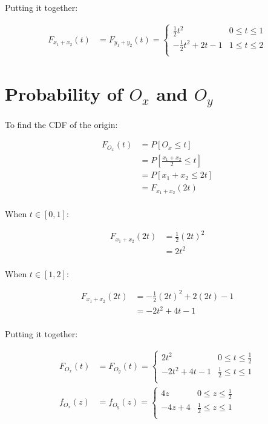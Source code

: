 \documentclass{article}
\begin{document}
Putting it together:

\begin{align*}
F_{x_1 + x_2}(t) &= F_{y_1 + y_2}(t) =
\begin{cases}
    \frac{1}{2}t^2           & 0 \leq t \leq 1 \\
    -\frac{1}{2}t^2 + 2t - 1 & 1 \leq t \leq 2 \\
\end{cases}
\end{align*}

\section{Probability of $O_x$ and $O_y$}

To find the CDF of the origin:

\begin{align*}
F_{O_x}(t)
&= P \left[ O_x \leq t \right] \\
&= P \left[ \frac{x_1 + x_2}{2} \leq t \right] \\
&= P \left[ x_1 + x_2 \leq 2t \right] \\
&= F_{x_1 + x_2}(2t) \\
\end{align*}

When $t \in [0, 1]$:

\begin{align*}
F_{x_1 + x_2}(2t)
&= \frac{1}{2}(2t)^2 \\
&= 2t^2 \\
\end{align*}

When $t \in [1, 2]$:

\begin{align*}
F_{x_1 + x_2}(2t)
&= -\frac{1}{2}(2t)^2 + 2(2t) - 1 \\
&= -2t^2 + 4t - 1 \\
\end{align*}

Putting it together:

\begin{align*}
F_{O_x}(t) &= F_{O_y}(t) =
\begin{cases}
    2t^2           & 0 \leq t \leq \frac{1}{2} \\
    -2t^2 + 4t - 1 & \frac{1}{2} \leq t \leq 1 \\
\end{cases}
\\
f_{O_x}(z) &= f_{O_y}(z) =
\begin{cases}
    4z      & 0 \leq z \leq \frac{1}{2} \\
    -4z + 4 & \frac{1}{2} \leq z \leq 1 \\
\end{cases}
\end{align*}
\end{document}
